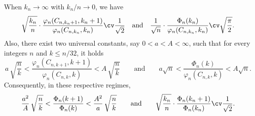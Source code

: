\begin{lemma}\label{lem:phi_et_Phi}
When $k_n\to\infty$ with $k_n/n\to0$, we have
\begin{equation}\label{eq:equiv_kn}
\sqrt{\frac{k_n}{n}} \cdot \frac{\varphi_n(C_{n,k_n+1},k_n+1)}{\varphi_n(C_{n,k_n},k_n)} \cv \frac{1}{\sqrt{2}}
\quad\text{and}\quad
\frac{1}{\sqrt{n}} \cdot \frac{\Phi_n(k_n)}{\varphi_{n}(C_{n,k_n},k_n)} \cv \sqrt{\frac{\pi}{2}}.
\end{equation}
Also, there exist two universal constants, say $0 < a < A < \infty$, such that for every integers $n$ and $k \le n/32$, it holds
\begin{equation}\label{eq:bornes_ratio}
a\,\sqrt{\frac{n}{k}} < \frac{\varphi_n(C_{n,k+1},k+1)}{\varphi_n(C_{n,k},k)} < A\,\sqrt{\frac{n}{k}}
\qquad\text{and}\qquad
a\sqrt{n} < \frac{\Phi_n(k)}{\varphi_{n}(C_{n,k},k)} < A \sqrt{n}.
\end{equation}
Consequently, in these respective regimes,
\[
\frac{a^2}{A}\,\sqrt{\frac{n}{k}}
< \frac{\Phi_n(k+1)}{\Phi_n(k)}
< \frac{A^2}{a}\,\sqrt{\frac{n}{k}}
\qquad\text{and}\qquad
\sqrt{\frac{k_n}{n}} \cdot \frac{\Phi_n(k_n+1)}{\Phi_n(k_n)} \cv \frac{1}{\sqrt{2}}.
\]
\end{lemma}


